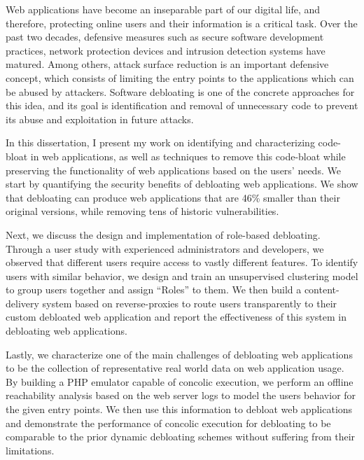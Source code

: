 Web applications have become an inseparable part of our digital life, and therefore, protecting online users and their information is a critical task. 
Over the past two decades, defensive measures such as secure software development practices, network protection devices and intrusion detection systems have matured. 
Among others, attack surface reduction is an important defensive concept, which consists of limiting the entry points to the applications which can be abused by attackers. 
Software debloating is one of the concrete approaches for this idea, and its goal is identification and removal of unnecessary code to prevent its abuse and exploitation in future attacks. 

In this dissertation, I present my work on identifying and characterizing code-bloat in web applications, as well as techniques to remove this code-bloat while preserving the functionality of web applications based on the users' needs.
We start by quantifying the security benefits of debloating web applications. We show that debloating can produce web applications that are 46\% smaller than their original versions, while removing tens of historic vulnerabilities. 

Next, we discuss the design and implementation of role-based debloating.
Through a user study with experienced administrators and developers, we observed that different users require access to vastly different features.
To identify users with similar behavior, we design and train an unsupervised clustering model to group users together and assign ``Roles'' to them. 
We then build a content-delivery system based on reverse-proxies to route users transparently to their custom debloated web application and report the effectiveness of this system in debloating web applications. 

Lastly, we characterize one of the main challenges of debloating web applications to be the collection of representative real world data on web application usage. By building a PHP emulator capable of concolic execution, we perform an offline reachability analysis based on the web server logs to model the users behavior for the given entry points. We then use this information to debloat web applications and demonstrate the performance of concolic execution for debloating to be comparable to the prior dynamic debloating schemes without suffering from their limitations.